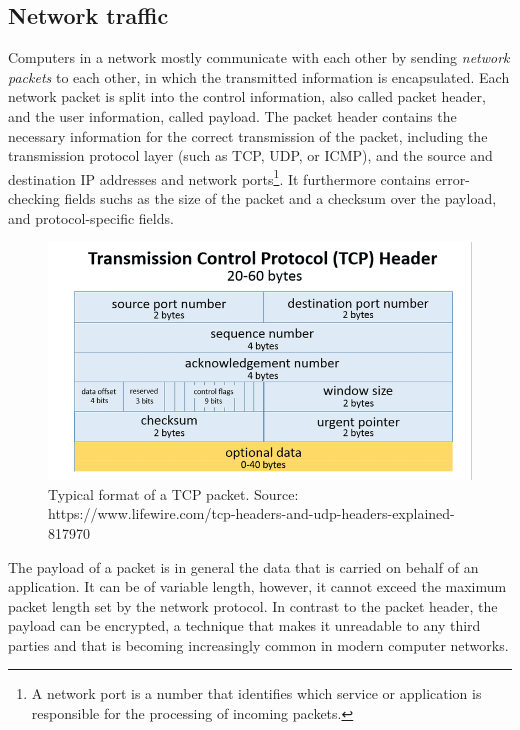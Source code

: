 \documentclass[a4paper,12pt,twoside]{article}
\begin{document}
\subsection{Network traffic}\label{traffic}



Computers in a network mostly communicate with each other by sending \textit{network packets} to each other, in which the transmitted information is encapsulated. Each network packet is split into the control information, also called packet header, and the user information, called payload. The packet header contains the necessary information for the correct transmission of the packet, including the transmission protocol layer (such as TCP, UDP, or ICMP), and the source and destination IP addresses and network ports\footnote{A network port is a number that identifies which service or application is responsible for the processing of incoming packets.}. It furthermore contains error-checking fields suchs as the size of the packet and a checksum over the payload, and protocol-specific fields. 


\begin{figure}[h!]
\centering
\includegraphics[scale=0.4]{images/tcp_header.png}
\caption{Typical format of a TCP packet. Source:\scriptsize{ https://www.lifewire.com/tcp-headers-and-udp-headers-explained-817970}\normalsize}
\end{figure}


The payload of a packet is in general the data that is carried on behalf of an application. It can be of variable length, however, it cannot exceed the maximum packet length set by the network protocol. In contrast to the packet header, the payload can be encrypted, a technique that makes it unreadable to any third parties and that is becoming increasingly common in modern computer networks. 
\end{document}
